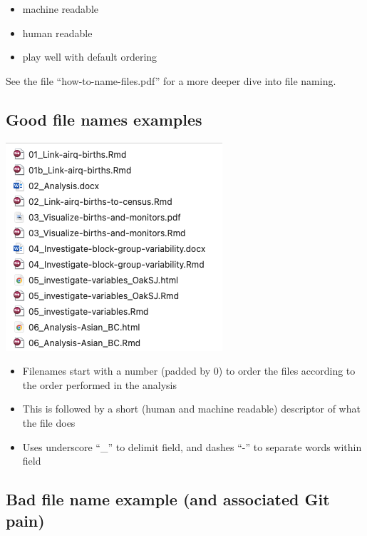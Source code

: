 \documentclass[
]{book}
\providecommand{\tightlist}{%
  \setlength{\itemsep}{0pt}\setlength{\parskip}{0pt}}
\begin{document}
\begin{itemize}
\tightlist
\item
  machine readable
\item
  human readable
\item
  play well with default ordering
\end{itemize}

See the file ``how-to-name-files.pdf'' for a more deeper dive into file naming.

\hypertarget{good-file-names-examples}{%
\subsection{Good file names examples}\label{good-file-names-examples}}

\includegraphics[width=0.75\linewidth]{./figures/Variable-names-example}

\begin{itemize}
\tightlist
\item
  Filenames start with a number (padded by 0) to order the files according to
  the order performed in the analysis
\item
  This is followed by a short (human and machine readable) descriptor of what
  the file does
\item
  Uses underscore ``\_'' to delimit field, and dashes ``-'' to separate words within field
\end{itemize}

\hypertarget{bad-file-name-example-and-associated-git-pain}{%
\subsection{Bad file name example (and associated Git pain)}\label{bad-file-name-example-and-associated-git-pain}}
\end{document}
